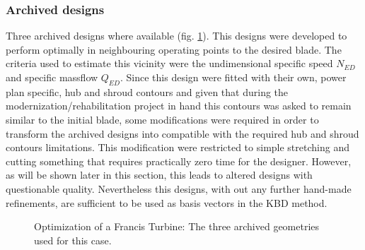 \subsubsection{Archived designs}
 Three archived designs where available (fig. \ref{design-bases}). This designs were developed to perform optimally in neighbouring operating points to the desired blade. The criteria used to estimate this vicinity were the undimensional specific speed $N_{ED}$ and specific massflow $Q_{ED}$. Since this design were fitted with their own, power plan specific, hub and shroud contours and given that during the modernization/rehabilitation project in hand this contours was asked to remain similar to the initial blade, some modifications were required in order to transform the archived designs into compatible with the required hub and shroud contours limitations. This modification were restricted to simple stretching and cutting something that requires practically zero time for the designer. However, as will be shown later in this section, this leads to altered designs with questionable quality. Nevertheless this designs, with out any further hand-made refinements, are sufficient to be used as basis vectors in the KBD method.                           

\begin{figure}[h!]
\begin{minipage}[b]{1\linewidth}
 \centering
\end{minipage}
\caption{Optimization of a Francis Turbine: The three archived geometries used for this case.}
\label{design-bases}
\end{figure}

